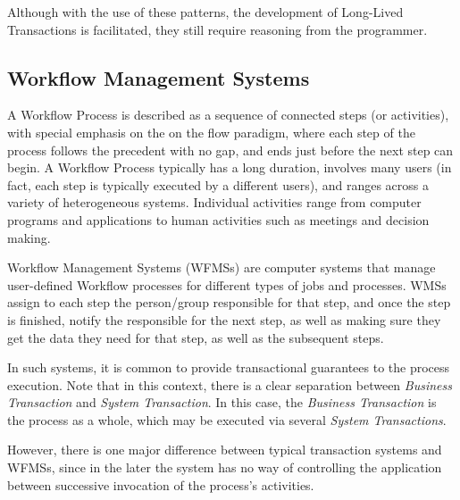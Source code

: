 \documentclass{llncs}
\begin{document}
Although with the use of these patterns, the development of Long-Lived
Transactions is facilitated, they still require reasoning from the
programmer.

\subsection{Workflow Management Systems}

A Workflow Process is described as a sequence of connected steps (or
activities), with special emphasis on the on the flow paradigm, where
each step of the process follows the precedent with no gap, and ends
just before the next step can begin. A Workflow Process typically has
a long duration, involves many users (in fact, each step is typically
executed by a different users), and ranges across a variety of
heterogeneous systems. Individual activities range from computer
programs and applications to human activities such as meetings and
decision making.

Workflow Management Systems (WFMSs) are computer systems that manage
user-defined Workflow processes for different types of jobs and
processes. WMSs assign to each step the person/group responsible for
that step, and once the step is finished, notify the responsible for
the next step, as well as making sure they get the data they need for
that step, as well as the subsequent steps.

In such systems, it is common to provide transactional guarantees to
the process execution. Note that in this context, there is a clear
separation between {\it Business Transaction} and {\it System
  Transaction}. In this case, the {\it Business Transaction} is the
process as a whole, which may be executed via several {\it System
  Transactions}.

However, there is one major difference between typical transaction
systems and WFMSs, since in the later the system has no way of
controlling the application between successive invocation of the
process's activities.
\end{document}
